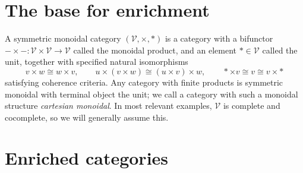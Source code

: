\section{The base for enrichment}

A symmetric monoidal category $(\mathcal{V} ,\times ,*)$ is a category with a bifunctor $-\times -: \mathcal{V} \times \mathcal{V}  \to \mathcal{V} $ called the monoidal product, and an element $*\in \mathcal{V} $ called the unit, together with specified natural isomorphisms
\[
	v\times w\cong w\times v,\qquad u\times (v\times w)\cong (u\times v)\times w,\qquad *\times v\cong v\cong v\times *
\]
satisfying coherence criteria. Any category with finite products is symmetric monoidal with terminal object the unit; we call a category with such a monoidal structure \emph{cartesian monoidal}. In most relevant examples, $\mathcal{V} $ is complete and cocomplete, so we will generally assume this.

\section{Enriched categories}

